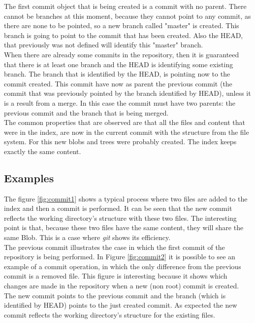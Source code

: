 The first commit object that is being created is a commit with no
parent. There cannot be branches
at this moment, because they cannot point to any commit, as there are none to be
pointed, so a new branch called "master" is created. This branch is going to point to 
the commit that has been created. Also the HEAD, that previously was 
not defined will identify this "master" branch.\\

When there are already some commits in the repository, then it is
guaranteed that there is at least one branch and the HEAD is
identifying some existing branch. The branch that is identified by the
HEAD, is pointing now to the commit created. This commit have now as
parent the previous commit (the commit that was previously pointed by the branch
identified by HEAD), unless it is a result from a merge. In this
case the commit must have two parents: the previous commit and the
branch that is being merged.\\

The common properties that are observed are that all the files and
content that were in the index, are now in the current commit with the
structure from the file system. For this new blobs and trees were
probably created. The index keeps exactly the same content.

\subsection{Examples}

The figure \ref{fig:commit1} shows a typical process where two files
are added to the index and then a commit is performed. It can be seen
that the new commit reflects the working directory's structure
with these two files. The interesting point is that, because these two files
have the same content, they will share the same
Blob. This is a case where \emph{git} shows its efficiency. \\

The previous commit illustrates the case in which the first commit of the repository is being
performed. In Figure \ref{fig:commit2} it is possible to see an example 
of a commit operation, in which the only difference from the previous 
commit is a removed file. This figure is 
interesting because it shows which changes are made in the repository when a
new (non root) commit is created. The new commit points to the previous commit and
the branch (which is identified by HEAD) points to the just created commit.
As expected the new commit reflects
the working directory's structure for the existing files.\\

